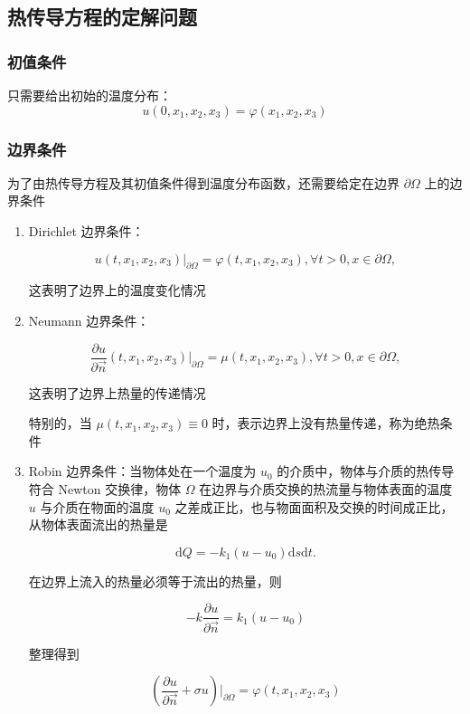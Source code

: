 \documentclass{beamer}
\begin{document}
\subsection{热传导方程的定解问题}

\begin{frame}[allowframebreaks]
	\frametitle{初值条件}
	只需要给出初始的温度分布：
	\begin{equation}
		u(0,x_1,x_2,x_3)=\varphi(x_1,x_2,x_3)
	\end{equation}
\end{frame}

\begin{frame}[allowframebreaks]
	\frametitle{边界条件}

	为了由热传导方程及其初值条件得到温度分布函数，还需要给定在边界 $\partial\Omega$ 上的边界条件

	\begin{enumerate}
		\item  Dirichlet 边界条件：

		      $$
			      u(t,x_1,x_2,x_3)|_{\partial\Omega}=\varphi(t,x_1,x_2,x_3),\forall t>0,x\in\partial\Omega,
		      $$

		      这表明了边界上的温度变化情况
		\item  Neumann 边界条件：

		      $$
			      \frac{\partial u}{\partial \vec{n}}(t,x_1,x_2,x_3)|_{\partial\Omega}=\mu(t,x_1,x_2,x_3),\forall t>0,x\in\partial\Omega,
		      $$

		      这表明了边界上热量的传递情况

		      特别的，当 $\mu(t,x_1,x_2,x_3)\equiv 0$ 时，表示边界上没有热量传递，称为绝热条件
		\item Robin 边界条件：当物体处在一个温度为 $u_0$ 的介质中，物体与介质的热传导符合 Newton 交换律，物体 $\Omega$ 在边界与介质交换的热流量与物体表面的温度 $u$ 与介质在物面的温度 $u_0$ 之差成正比，也与物面面积及交换的时间成正比，从物体表面流出的热量是

		      $$
			      \mathrm{d}Q=-k_1(u-u_0)\mathrm{d}s\mathrm{d}t.
		      $$

		      在边界上流入的热量必须等于流出的热量，则

		      $$
			      -k\frac{\partial u}{\partial \vec{n}}=k_1(u-u_0)
		      $$

		      整理得到

		      $$
			      \left(\frac{\partial u}{\partial \vec{n}}+\sigma u\right)\vert_{\partial \Omega}=\varphi(t,x_1,x_2,x_3)
		      $$
	\end{enumerate}
\end{frame}
\end{document}
